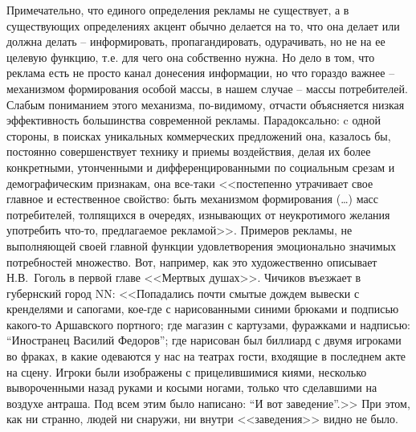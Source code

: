 Примечательно, что единого определения рекламы не существует, а в существующих
определениях акцент обычно делается на то, что она делает или должна делать --
информировать, пропагандировать, одурачивать, но не на ее целевую функцию, т.е.
для чего она собственно нужна. Но дело в том, что реклама есть не просто канал
донесения информации, но что гораздо важнее -- механизмом формирования особой массы,
в нашем случае -- массы потребителей. Слабым пониманием этого механизма, по-видимому,
отчасти объясняется низкая эффективность большинства современной рекламы.
Парадоксально: c одной стороны, в поисках уникальных коммерческих предложений
она, казалось бы, постоянно совершенствует технику и приемы воздействия,
делая их более конкретными, утонченными и дифференцированными по социальным
срезам и демографическим признакам, она все-таки <<постепенно утрачивает свое
главное и естественное свойство: быть механизмом формирования (\ldots) масс
потребителей, толпящихся в очередях, изнывающих от неукротимого желания
употребить что-то, предлагаемое рекламой>>.\autocite[][312]{book:olshansky} Примеров
рекламы, не выполняющей своей главной функции удовлетворения эмоционально
значимых потребностей множество. Вот, например, как это художественно описывает
Н.В.~Гоголь в первой главе <<Мертвых душах>>. Чичиков въезжает в губернский город NN:
<<Попадались почти смытые дождем вывески с кренделями и сапогами, кое-где с
нарисованными синими брюками и подписью какого-то Аршавского портного;
где магазин с картузами, фуражками и надписью: ``Иностранец Василий Федоров'';
где нарисован был биллиард с двумя игроками во фраках, в какие одеваются
у нас на театрах гости, входящие в последнем акте на сцену.
Игроки были изображены с прицелившимися киями, несколько вывороченными
назад руками и косыми ногами, только что сделавшими на воздухе антраша.
Под всем этим было написано: ``И вот заведение''.>>\autocite{gogol2006}
При этом, как ни странно, людей ни снаружи, ни внутри <<заведения>> видно не было.


